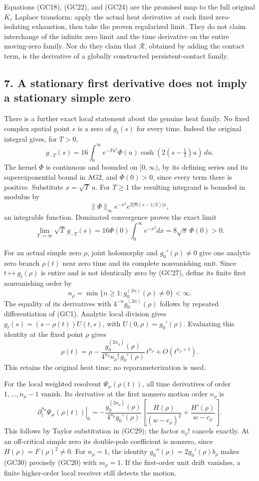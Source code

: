 \documentclass[
  10pt,
  a4paper,
]{article}
\begin{document}
Equations (GC18), (GC22), and (GC24) are the promised map to the full
original \(K_r\) Laplace transform: apply the actual heat derivative at
each fixed zero-isolating exhaustion, then take the proven regularized
limit. They do not claim interchange of the infinite zero limit and the
time derivative on the entire moving-zero family. Nor do they claim that
\(\mathcal R\), obtained by adding the contact term, is the derivative
of a globally constructed persistent-contact family.

\subsection{7. A stationary first derivative does not imply a stationary
simple
zero}\label{a-stationary-first-derivative-does-not-imply-a-stationary-simple-zero}

There is a further exact local statement about the genuine heat family.
No fixed complex spatial point \(s\) is a zero of \(g_t(s)\) for every
time. Indeed the original integral gives, for \(T>0\), \[
g_{-T}(s)=16\int_0^\infty
e^{-Tu^2}\Phi(u)\cosh(2(s-\tfrac12)u)\,du.
\tag{GC26}
\] The kernel \(\Phi\) is continuous and bounded on \([0,\infty)\), by
its defining series and its superexponential bound in AG2, and
\(\Phi(0)>0\), since every term there is positive. Substitute
\(x=\sqrt T\,u\). For \(T\ge1\) the resulting integrand is bounded in
modulus by \[
\|\Phi\|_\infty e^{-x^2}e^{2|\Re(s-1/2)|x},
\] an integrable function. Dominated convergence proves the exact limit
\[
\lim_{T\to\infty}\sqrt T\,g_{-T}(s)
=16\Phi(0)\int_0^\infty e^{-x^2}dx
=8\sqrt\pi\,\Phi(0)>0.
\tag{GC27}
\]

For an actual simple zero \(\rho\), joint holomorphy and
\(g_0'(\rho)\ne0\) give one analytic zero branch \(\rho(t)\) near zero
time and its complete nonvanishing unit. Since \(t\mapsto g_t(\rho)\) is
entire and is not identically zero by (GC27), define its finite first
nonvanishing order by \[
n_\rho=\min\{n\ge1:g_0^{(2n)}(\rho)\ne0\}<\infty.
\tag{GC28}
\] The equality of its derivatives with \(4^{-n}g_0^{(2n)}(\rho)\)
follows by repeated differentiation of (GC1). Analytic local division
gives \(g_t(s)=(s-\rho(t))U(t,s)\), with \(U(0,\rho)=g_0'(\rho)\).
Evaluating this identity at the fixed point \(\rho\) gives \[
\rho(t)=\rho-
\frac{g_0^{(2n_\rho)}(\rho)}
{4^{n_\rho}n_\rho!\,g_0'(\rho)}\,t^{n_\rho}
+O(t^{n_\rho+1}).
\tag{GC29}
\] This retains the original heat time; no reparameterization is used.

For the local weighted resolvent \(\Psi_w(\rho(t))\), all time
derivatives of order \(1,\ldots,n_\rho-1\) vanish. Its derivative at the
first nonzero motion order \(n_\rho\) is \[
\left.\partial_t^{n_\rho}\Psi_w(\rho(t))\right|_0
=-\frac{g_0^{(2n_\rho)}(\rho)}
{4^{n_\rho}g_0'(\rho)}
\left[
\frac{H(\rho)}{(w-c_\rho)^2}
+\frac{H'(\rho)}{w-c_\rho}
\right].
\tag{GC30}
\] This follows by Taylor substitution in (GC29); the factor \(n_\rho!\)
cancels exactly. At an off-critical simple zero its double-pole
coefficient is nonzero, since \(H(\rho)=F(\rho)^2\ne0\). For
\(n_\rho=1\), the identity \(g_0''(\rho)=2g_0'(\rho)b_\rho\) makes
(GC30) precisely (GC20) with \(m_\rho=1\). If the first-order unit drift
vanishes, a finite higher-order local receiver still detects the motion.
\end{document}
